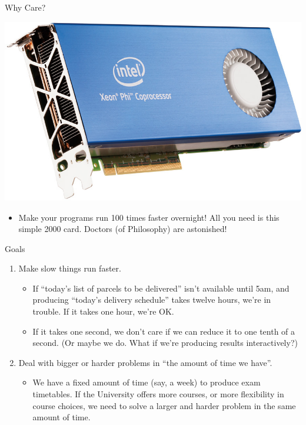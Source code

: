 \documentclass{beamer}
\begin{document}
\begin{frame}{Why Care?}
    \begin{center}
        \includegraphics*[keepaspectratio=true,scale=0.2]{images/xeon-phi.jpg}
    \end{center}

    \begin{itemize}
        \item Make your programs run 100 times faster overnight! All you need is this simple
            \textsterling{}2000 card. Doctors (of Philosophy) are astonished!
    \end{itemize}
\end{frame}

\begin{frame}{Goals}
    \begin{enumerate}
        \item Make slow things run faster.
            \begin{itemize}
                \item If ``today's list of parcels to be delivered'' isn't available until 5am, and
                    producing ``today's delivery schedule'' takes twelve hours, we're in trouble. If
                    it takes one hour, we're OK.

                \item If it takes one second, we don't care if we can reduce it to one tenth of a
                    second. (Or maybe we do. What if we're producing results interactively?)
            \end{itemize}

        \item Deal with bigger or harder problems in ``the amount of time we have''.
            \begin{itemize}
                \item We have a fixed amount of time (say, a week) to produce exam timetables. If
                    the University offers more courses, or more flexibility in course choices, we
                    need to solve a larger and harder problem in the same amount of time.
            \end{itemize}
    \end{enumerate}
\end{frame}
\end{document}
